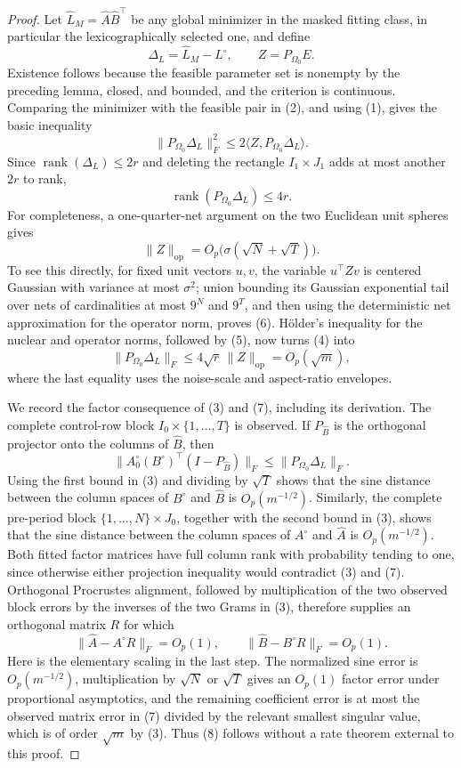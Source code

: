 \documentclass{article}
\begin{document}
\begin{proof}
Let \(\widehat L_M=\widehat A\widehat B^{\top}\) be any global minimizer in the masked fitting class, in particular the lexicographically selected one, and define
\[
 \Delta_L=\widehat L_M-L^\circ,\qquad Z=P_{\Omega_0}E.
\]
Existence follows because the feasible parameter set is nonempty by the preceding lemma, closed, and bounded, and the criterion is continuous.  Comparing the minimizer with the feasible pair in (2), and using (1), gives the basic inequality
\[
 \|P_{\Omega_0}\Delta_L\|_F^2
 \leq 2\langle Z,P_{\Omega_0}\Delta_L\rangle.
\tag{4}
\]
Since \(\operatorname{rank}(\Delta_L)\leq2r\) and deleting the rectangle \(I_1\times J_1\) adds at most another \(2r\) to rank,
\[
 \operatorname{rank}(P_{\Omega_0}\Delta_L)\leq4r.
\tag{5}
\]
For completeness, a one-quarter-net argument on the two Euclidean unit spheres gives
\[
 \|Z\|_{\mathrm{op}}=O_p\bigl(\sigma(\sqrt N+\sqrt T)\bigr).
\tag{6}
\]
To see this directly, for fixed unit vectors \(u,v\), the variable \(u^{\top}Zv\) is centered Gaussian with variance at most \(\sigma^2\); union bounding its Gaussian exponential tail over nets of cardinalities at most \(9^N\) and \(9^T\), and then using the deterministic net approximation for the operator norm, proves (6).  Hölder's inequality for the nuclear and operator norms, followed by (5), now turns (4) into
\[
 \|P_{\Omega_0}\Delta_L\|_F
 \leq4\sqrt r\,\|Z\|_{\mathrm{op}}
 =O_p(\sqrt m),
\tag{7}
\]
where the last equality uses the noise-scale and aspect-ratio envelopes.

We record the factor consequence of (3) and (7), including its derivation.  The complete control-row block \(I_0\times\{1,\ldots,T\}\) is observed.  If \(P_{\widehat B}\) is the orthogonal projector onto the columns of \(\widehat B\), then
\[
 \|A^\circ_0(B^\circ)^{\top}(I-P_{\widehat B})\|_F
 \leq \|P_{\Omega_0}\Delta_L\|_F.
\]
Using the first bound in (3) and dividing by \(\sqrt T\) shows that the sine distance between the column spaces of \(B^\circ\) and \(\widehat B\) is \(O_p(m^{-1/2})\).  Similarly, the complete pre-period block \(\{1,\ldots,N\}\times J_0\), together with the second bound in (3), shows that the sine distance between the column spaces of \(A^\circ\) and \(\widehat A\) is \(O_p(m^{-1/2})\).  Both fitted factor matrices have full column rank with probability tending to one, since otherwise either projection inequality would contradict (3) and (7).  Orthogonal Procrustes alignment, followed by multiplication of the two observed block errors by the inverses of the two Grams in (3), therefore supplies an orthogonal matrix \(R\) for which
\[
 \|\widehat A-A^\circ R\|_F=O_p(1),
 \qquad
 \|\widehat B-B^\circ R\|_F=O_p(1).
\tag{8}
\]
Here is the elementary scaling in the last step.  The normalized sine error is \(O_p(m^{-1/2})\), multiplication by \(\sqrt N\) or \(\sqrt T\) gives an \(O_p(1)\) factor error under proportional asymptotics, and the remaining coefficient error is at most the observed matrix error in (7) divided by the relevant smallest singular value, which is of order \(\sqrt m\) by (3).  Thus (8) follows without a rate theorem external to this proof.


\end{proof}
\end{document}
